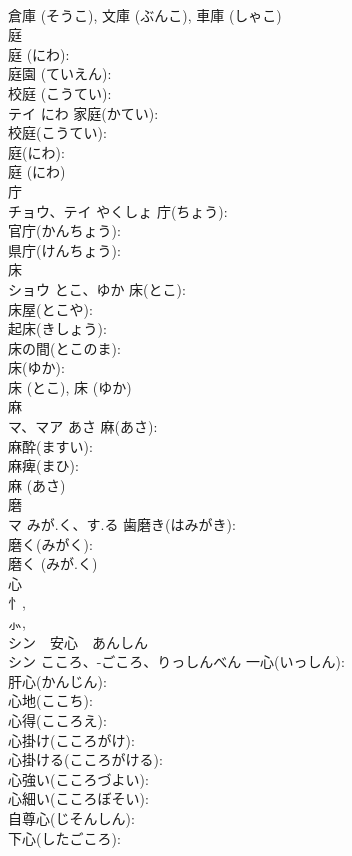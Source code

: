 \documentclass[8pt]{extreport}
\begin{document}
\begin{CJK}{UTF8}{min}
\\	倉庫 (そうこ), 文庫 (ぶんこ), 車庫 (しゃこ)
\\	庭			
\\	庭 (にわ): 
\\	庭園 (ていえん): 
\\	校庭 (こうてい): 
\\	テイ	にわ	家庭(かてい): 
\\	校庭(こうてい): 
\\	庭(にわ): 
\\	庭 (にわ)
\\	庁			
\\	チョウ、テイ	やくしょ	庁(ちょう): 
\\	官庁(かんちょう): 
\\	県庁(けんちょう): 
\\	床			
\\	ショウ	とこ、ゆか	床(とこ): 
\\	床屋(とこや): 
\\	起床(きしょう): 
\\	床の間(とこのま): 
\\	床(ゆか): 
\\	床 (とこ), 床 (ゆか)
\\	麻			
\\	マ、マア	あさ	麻(あさ): 
\\	麻酔(ますい): 
\\	麻痺(まひ): 
\\	麻 (あさ)
\\	磨			
\\	マ	みが.く、す.る	歯磨き(はみがき): 
\\	磨く(みがく): 
\\	磨く (みが.く)
\\	心			
\\	⺖, 
\\	⺗, 
\\	シン　安心　あんしん
\\	シン	こころ、-ごころ、りっしんべん	一心(いっしん): 
\\	肝心(かんじん): 
\\	心地(ここち): 
\\	心得(こころえ): 
\\	心掛け(こころがけ): 
\\	心掛ける(こころがける): 
\\	心強い(こころづよい): 
\\	心細い(こころぼそい): 
\\	自尊心(じそんしん): 
\\	下心(したごころ): 

\end{CJK}
\end{document}
